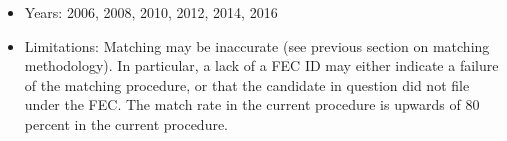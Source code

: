 \documentclass[10pt,article,oneside]{memoir}
\theoremstyle{definition}
\begin{document}
\begin{itemize}
\tightlist
\item
  Years: 2006, 2008, 2010, 2012, 2014, 2016
\item
  Limitations: Matching may be inaccurate (see previous section on
  matching methodology). In particular, a lack of a FEC ID may either
  indicate a failure of the matching procedure, or that the candidate in
  question did not file under the FEC. The match rate in the current
  procedure is upwards of 80 percent in the current procedure.
\end{itemize}
\end{document}
